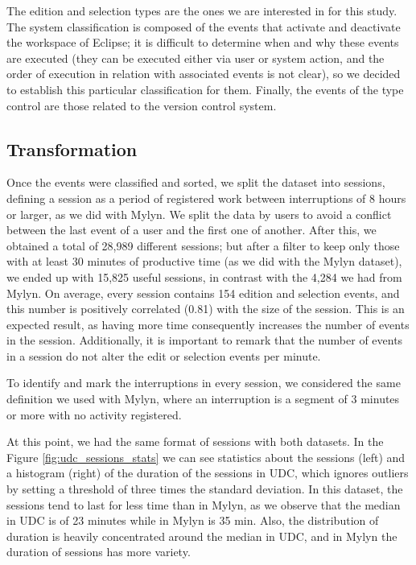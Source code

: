 \documentclass[times]{smrauth}
\begin{document}
The edition and selection types are the ones we are interested in for this study. The system classification is composed of the events that activate and deactivate the workspace of Eclipse; it is difficult to determine when and why these events are executed (they can be executed either via user or system action, and the order of execution in relation with associated events is not clear), so we decided to establish this particular classification for them. Finally, the events of the type control are those related to the version control system. 

\subsection{Transformation}
Once the events were classified and sorted, we split the dataset into sessions, defining a session as a period of registered work between interruptions of 8 hours or larger, as we did with Mylyn. We split the data by users to avoid a conflict between the last event of a user and the first one of another. After this, we obtained a total of 28,989 different sessions; but after a filter to keep only those with at least 30 minutes of productive time (as we did with the Mylyn dataset), we ended up with 15,825 useful sessions, in contrast with the 4,284 we had from Mylyn. On average, every session contains 154 edition and selection events, and this number is positively correlated (0.81) with the size of the session. This is an expected result, as having more time consequently increases the number of events in the session. Additionally, it is important to remark that the number of events in a session do not alter the edit or selection events per minute.

To identify and mark the interruptions in every session, we considered the same definition we used with Mylyn, where an interruption is a segment of 3 minutes or more with no activity registered. 

At this point, we had the same format of sessions with both datasets. In the Figure \ref{fig:udc_sessions_stats} we can see statistics about the sessions (left) and a histogram (right) of the duration of the sessions in UDC, which ignores outliers by setting a threshold of three times the standard deviation. In this dataset, the sessions tend to last for less time than in Mylyn, as we observe that the median in UDC is of 23 minutes while in Mylyn is 35 min. Also, the distribution of duration is heavily concentrated around the median in UDC, and in Mylyn the duration of sessions has more variety.
\end{document}
